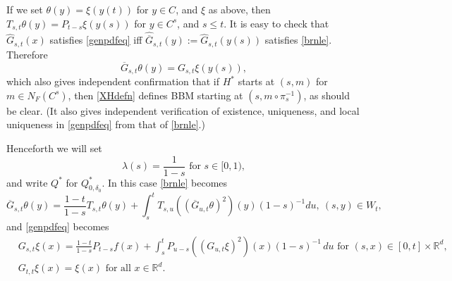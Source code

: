 \documentclass[12pt]{article}
\numberwithin{theorem}{section}
\theoremstyle{def}
\numberwithin{equation}{section}
\newcommand{\R}{\mathbb{R}}
\begin{document}
If we set $\theta(y)=\xi(y(t))$ for $y\in C$, and $\xi$ as above, then $T_{s,t}\theta(y)=P_{t-s}\xi(y(s))$ for $y\in C^s$, and $s\le t$.  It is easy to check that $\widehat G_{s,t}(x)$ satisfies \eqref{genpdfeq} iff $\widehat{\overline G}_{s,t}(y):=\widehat G_{s,t}(y(s))$ satisfies \eqref{brnle}. Therefore 
\begin{equation}\label{HXpgfs}\overline G_{s,t}\theta(y)=G_{s,t}\xi(y(s)),
\end{equation}
which also gives independent confirmation that if $H^*$ starts at $(s,m)$ for $m\in N_F(C^s)$, then \eqref{XHdefn}  defines BBM starting at $(s,m\circ\pi_s^{-1})$, as should be clear.  (It also gives independent verification of existence, uniqueness, and local uniqueness in \eqref{genpdfeq} from that of \eqref{brnle}.)

Henceforth we will set
\[\lambda(s)=\frac{1}{1-s}\text{ for }s\in[0,1),\]
and write $Q^*$ for $Q^*_{0,\delta_0}$. In this case \eqref{brnle} becomes
\begin{equation*}
\overline{G}_{s,t}\theta(y)=\frac{1-t}{1-s}T_{s,t}\theta(y)+\int_s^tT_{s,u}((\overline{G}_{u,t}\theta)^2)(y)(1-s)^{-1}du,\ (s,y)\in W_t,
\end{equation*}
and \eqref{genpdfeq} becomes
\begin{align}\label{BBMnle}
\nonumber  &G_{s,t}\xi(x)=\frac{1-t}{1-s}P_{t-s}f(x)+\int_s^tP_{u-s}((G_{u,t}\xi)^2)(x)(1-s)^{-1}\,du\text{ for }(s,x)\in[0,t]\times\R^d,\\ &G_{t,t}\xi(x)=\xi(x)\text{ for all }x\in\R^d.
\end{align}
\end{document}
